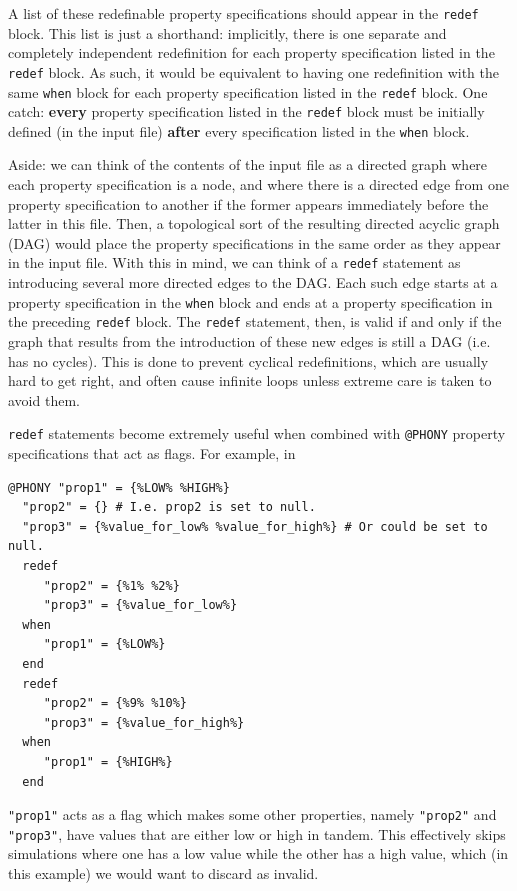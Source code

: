 \documentclass{article}
\begin{document}
A list of these redefinable property specifications should appear in the {\tt redef} block. This list is just a shorthand: implicitly, there is one separate and completely independent redefinition for each property specification listed in the {\tt redef} block. As such, it would be equivalent to having one redefinition with the same {\tt when} block for each property specification listed in the {\tt redef} block. One catch: \textbf{every} property specification listed in the {\tt redef} block must be initially defined (in the input file) \textbf{after} every specification listed in the {\tt when} block.

\begin{sideblock}
Aside: we can think of the contents of the input file as a directed graph where each property specification is a node, and where there is a directed edge from one property specification to another if the former appears immediately before the latter in this file. Then, a topological sort of the resulting directed acyclic graph (DAG) would place the property specifications in the same order as they appear in the input file. With this in mind, we can think of a {\tt redef} statement as introducing several more directed edges to the DAG. Each such edge starts at a property specification in the {\tt when} block and ends at a property specification in the preceding {\tt redef} block. The {\tt redef} statement, then, is valid if and only if the graph that results from the introduction of these new edges is still a DAG (i.e. has no cycles). This is done to prevent cyclical redefinitions, which are usually hard to get right, and often cause infinite loops unless extreme care is taken to avoid them.
\end{sideblock}

{\tt redef} statements become extremely useful when combined with {\tt @PHONY} property specifications that act as flags. For example, in

\begin{lstlisting}[]
  @PHONY "prop1" = {%LOW% %HIGH%}
  "prop2" = {} # I.e. prop2 is set to null.
  "prop3" = {%value_for_low% %value_for_high%} # Or could be set to null.
  redef
     "prop2" = {%1% %2%}
     "prop3" = {%value_for_low%}
  when
     "prop1" = {%LOW%}
  end
  redef
     "prop2" = {%9% %10%}
     "prop3" = {%value_for_high%}
  when
     "prop1" = {%HIGH%}
  end
\end{lstlisting}

{\tt "prop1"} acts as a flag which makes some other properties, namely {\tt "prop2"} and {\tt "prop3"}, have values that are either low or high in tandem. This effectively skips simulations where one has a low value while the other has a high value, which (in this example) we would want to discard as invalid.
\end{document}
